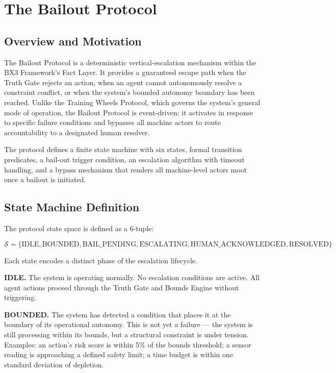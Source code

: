 \section{The Bailout Protocol}
\label{sec:bailout}

\subsection{Overview and Motivation}
The Bailout Protocol is a deterministic vertical-escalation mechanism within the BX3 Framework's Fact Layer. It provides a guaranteed escape path when the Truth Gate rejects an action, when an agent cannot autonomously resolve a constraint conflict, or when the system's bounded autonomy boundary has been reached. Unlike the Training Wheels Protocol, which governs the system's general mode of operation, the Bailout Protocol is event-driven: it activates in response to specific failure conditions and bypasses all machine actors to route accountability to a designated human resolver.

The protocol defines a finite state machine with six states, formal transition predicates, a bail-out trigger condition, an escalation algorithm with timeout handling, and a bypass mechanism that renders all machine-level actors moot once a bailout is initiated.

\subsection{State Machine Definition}
\label{sec:states}

The protocol state space is defined as a 6-tuple:

\begin{equation}
\mathcal{S} = \{ \text{IDLE}, \text{BOUNDED}, \text{BAIL\_PENDING}, \text{ESCALATING}, \text{HUMAN\_ACKNOWLEDGED}, \text{RESOLVED} \}
\end{equation}

Each state encodes a distinct phase of the escalation lifecycle.

\medskip\noindent\textbf{IDLE.} The system is operating normally. No escalation conditions are active. All agent actions proceed through the Truth Gate and Bounds Engine without triggering.

\medskip\noindent\textbf{BOUNDED.} The system has detected a condition that places it at the boundary of its operational autonomy. This is not yet a failure --- the system is still processing within its bounds, but a structural constraint is under tension. Examples: an action's risk score is within 5\% of the bounds threshold; a sensor reading is approaching a defined safety limit; a time budget is within one standard deviation of depletion.

